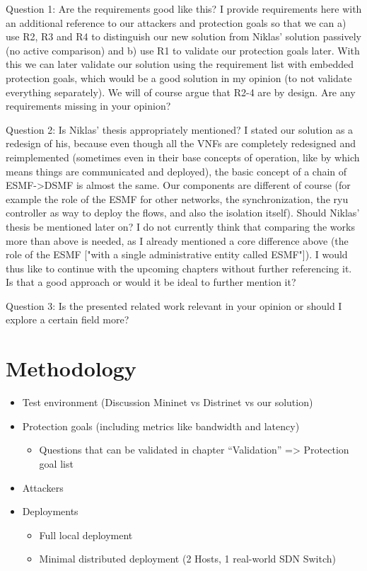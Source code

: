 \documentclass{article}
\begin{document}
Question 1: Are the requirements good like this? I provide requirements here with an additional reference to our attackers and protection goals so that we can a) use R2, R3 and R4 to distinguish our new solution from Niklas' solution passively (no active comparison) and b) use R1 to validate our protection goals later. With this we can later validate our solution using the requirement list with embedded protection goals, which would be a good solution in my opinion (to not validate everything separately). We will of course argue that R2-4 are by design. Are any requirements missing in your opinion?

Question 2: Is Niklas' thesis appropriately mentioned? I stated our solution as a redesign of his, because even though all the VNFs are completely redesigned and reimplemented (sometimes even in their base concepts of operation, like by which means things are communicated and deployed), the basic concept of a chain of ESMF->DSMF is almost the same. Our components are different of course (for example the role of the ESMF for other networks, the synchronization, the ryu controller as way to deploy the flows, and also the isolation itself). Should Niklas' thesis be mentioned later on? I do not currently think that comparing the works more than above is needed, as I already mentioned a core difference above (the role of the ESMF ["with a single administrative entity called ESMF"]). I would thus like to continue with the upcoming chapters without further referencing it. Is that a good approach or would it be ideal to further mention it?

Question 3: Is the presented related work relevant in your opinion or should I explore a certain field more?

\section{Methodology}
\begin{itemize}
    \item Test environment (Discussion Mininet vs Distrinet vs our solution)
    \item Protection goals (including metrics like bandwidth and latency)
    \begin{itemize}
        \item Questions that can be validated in chapter “Validation” => Protection goal list
    \end{itemize}
    \item Attackers
    \item Deployments
    \begin{itemize}
        \item Full local deployment
        \item Minimal distributed deployment (2 Hosts, 1 real-world SDN Switch)
    \end{itemize}
\end{itemize}
\end{document}
